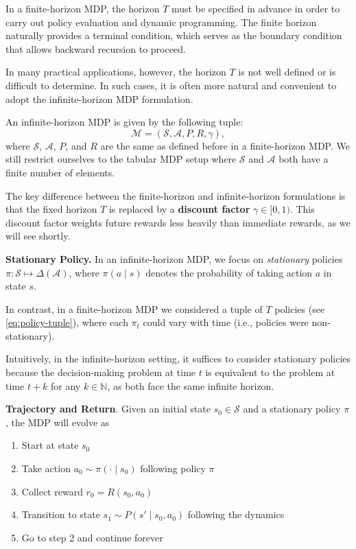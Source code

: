 \documentclass[
]{book}
\providecommand{\tightlist}{%
  \setlength{\itemsep}{0pt}\setlength{\parskip}{0pt}}
\theoremstyle{definition}
\theoremstyle{definition}
\theoremstyle{definition}
\theoremstyle{definition}
\theoremstyle{remark}
\begin{document}
In a finite-horizon MDP, the horizon \(T\) must be specified in advance in order to carry out policy evaluation and dynamic programming. The finite horizon naturally provides a terminal condition, which serves as the boundary condition that allows backward recursion to proceed.

In many practical applications, however, the horizon \(T\) is not well defined or is difficult to determine. In such cases, it is often more natural and convenient to adopt the infinite-horizon MDP formulation.

An infinite-horizon MDP is given by the following tuple:
\[
\mathcal{M} = (\mathcal{S}, \mathcal{A}, P, R, \gamma),
\]
where \(\mathcal{S}\), \(\mathcal{A}\), \(P\), and \(R\) are the same as defined before in a finite-horizon MDP. We still restrict ourselves to the tabular MDP setup where \(\mathcal{S}\) and \(\mathcal{A}\) both have a finite number of elements.

The key difference between the finite-horizon and infinite-horizon formulations is that the fixed horizon \(T\) is replaced by a \textbf{discount factor} \(\gamma \in [0,1)\). This discount factor weights future rewards less heavily than immediate rewards, as we will see shortly.

\textbf{Stationary Policy.} In an infinite-horizon MDP, we focus on \emph{stationary} policies \(\pi: \mathcal{S} \mapsto \Delta(\mathcal{A})\), where \(\pi(a \mid s)\) denotes the probability of taking action \(a\) in state \(s\).

In contrast, in a finite-horizon MDP we considered a tuple of \(T\) policies (see \eqref{eq:policy-tuple}), where each \(\pi_t\) could vary with time (i.e., policies were non-stationary).

Intuitively, in the infinite-horizon setting, it suffices to consider stationary policies because the decision-making problem at time \(t\) is equivalent to the problem at time \(t + k\) for any \(k \in \mathbb{N}\), as both face the same infinite horizon.

\textbf{Trajectory and Return}. Given an initial state \(s_0 \in \mathcal{S}\) and a stationary policy \(\pi\), the MDP will evolve as

\begin{enumerate}
\def\labelenumi{\arabic{enumi}.}
\tightlist
\item
  Start at state \(s_0\)
\item
  Take action \(a_0 \sim \pi(\cdot \mid s_0)\) following policy \(\pi\)
\item
  Collect reward \(r_0 = R(s_0, a_0)\)
\item
  Transition to state \(s_1 \sim P(s' \mid s_0, a_0)\) following the dynamics
\item
  Go to step 2 and continue forever
\end{enumerate}
\end{document}
